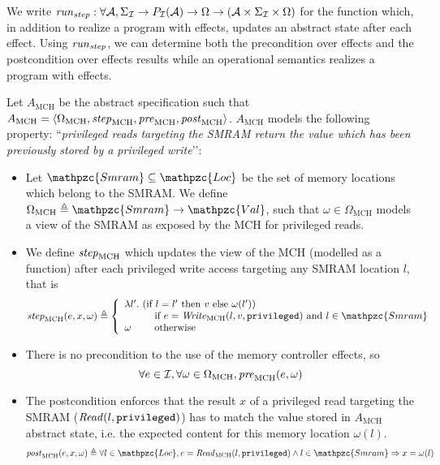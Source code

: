We write
$\mathit{run}_{\mathit{step}} : \forall \mathcal{A}, \Sigma_{\mathcal{I}} \rightarrow
P_{\mathcal{I}}(\mathcal{A}) \rightarrow \Omega \rightarrow (\mathcal{A} \times
\Sigma_{\mathcal{I}} \times \Omega)$ for the function which, in addition to realize a
program with effects, updates an abstract state after each effect.
%
Using $\mathit{run}_{\mathit{step}}$, we can determine both the precondition over
effects and the postcondition over effects results while an operational
semantics realizes a program with effects.

\begin{example} \label{ex:mch-abs-specs} Let $A_{\mathrm{MCH}}$ be the abstract
  specification such that
  $A_{\mathrm{MCH}} = \langle \Omega_{\mathrm{MCH}}, \mathit{step}_{\mathrm{MCH}},
  \mathit{pre}_{\mathrm{MCH}}, \mathit{post}_{\mathrm{MCH}} \rangle$.
  $A_{\mathrm{MCH}}$ models the following property: ``\emph{privileged reads
    targeting the SMRAM return the value which has been previously stored by a
    privileged write}’’:
  \begin{itemize}
  \item Let $\mathpzc{Smram} \subseteq \mathpzc{Loc}$ be the set of memory
    locations which belong to the SMRAM.  We define
    $\Omega_{\mathrm{MCH}} \triangleq \mathpzc{Smram} \rightarrow
    \mathpzc{Val}$, such that $\omega \in \Omega_{\mathrm{MCH}}$ models a view
    of the SMRAM as exposed by the MCH for privileged reads.
  \item We define $\mathit{step}_{\mathrm{MCH}}$ which updates the view of the MCH
    (modelled as a function) after each privileged write access targeting any
    SMRAM location $l$, that is
    \[ \func{step}_{\mathrm{MCH}}(e, x, \omega) \triangleq \left\{
        \begin{array}{l}
          \lambda l'.  \text{ (if } l = l' \text{ then } v \text{ else } \omega(l')) \\
          \qquad\ \ \text{ if } e = \func{Write}_{\mathrm{MCH}}(l, v, \val{privileged})
          \text{ and } l \in \mathpzc{Smram} \\
          \omega \qquad \text{ otherwise}
        \end{array}
      \right.
    \]
  \item There is no precondition to the use of the memory controller effects, so
    \[ \forall e \in \mathcal{I},\forall \omega \in \Omega_{\mathrm{MCH}},
      \mathit{pre}_{\mathrm{MCH}}(e, \omega) \]
  \item The postcondition enforces that the result $x$ of a privileged read
    targeting the SMRAM ($\mathit{Read}(l, \mathtt{privileged})$) has to match the
    value stored in $A_{\mathrm{MCH}}$ abstract state, i.e. the expected content
    for this memory location $\omega(l)$.
    \[ \func{post}_{\mathrm{MCH}}(e, x, \omega) \triangleq \forall l \in
      \mathpzc{Loc}, e = \func{Read}_{\mathrm{MCH}}(l, \val{privileged}) \wedge
      l \in \mathpzc{Smram} \Rightarrow x = \omega(l)
    \]
  \end{itemize}
\end{example}

